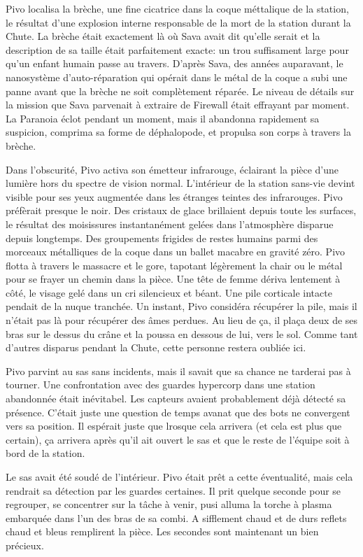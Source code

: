 Pivo localisa la brèche, une fine cicatrice dans la coque méttalique de la station, le résultat d'une explosion interne responsable de la mort de la station durant la Chute. La brèche était exactement là où Sava avait dit qu'elle serait et la description de sa taille était parfaitement exacte: un trou suffisament large pour qu'un enfant humain passe au travers. D'après Sava, des années auparavant, le nanosystème d'auto-réparation qui opérait dans le métal de la coque a subi une panne avant que la brèche ne soit complètement réparée. Le niveau de détails sur la mission que Sava parvenait à extraire de Firewall était effrayant par moment. La Paranoia éclot pendant un moment, mais il abandonna rapidement sa suspicion, comprima sa forme de déphalopode, et propulsa son corps à travers la brèche. 

Dans l'obscurité, Pivo activa son émetteur infrarouge, éclairant la pièce d'une lumière hors du spectre de vision normal. L'intérieur de la station sans-vie devint visible pour ses yeux augmentée dans les étranges teintes des infrarouges. Pivo préfèrait presque le noir. Des cristaux de glace brillaient depuis toute les surfaces, le résultat des moisissures instantanément gelées dans l'atmosphère disparue depuis longtemps. Des groupements frigides de restes humains parmi des morceaux métalliques de la coque dans un ballet macabre en gravité zéro. Pivo flotta à travers le massacre et le gore, tapotant légèrement la chair ou le métal pour se frayer un chemin dans la pièce. Une tête de femme dériva lentement à côté, le visage gelé dans un cri silencieux et béant. Une pile corticale intacte pendait de la nuque tranchée. Un instant, Pivo considéra récupérer la pile, mais il n'était pas là pour récupérer des âmes perdues. Au lieu de ça, il plaça deux de ses bras sur le dessus du crâne et la poussa en dessous de lui, vers le sol. Comme tant d'autres disparus pendant la Chute, cette personne restera oubliée ici. 

Pivo parvint au sas sans incidents, mais il savait que sa chance ne tarderai pas à tourner. Une confrontation avec des guardes hypercorp dans une station abandonnée était inévitabel. Les capteurs avaient probablement déjà détecté sa présence. C'était juste une question de temps avanat que des bots ne convergent vers sa position. Il espérait juste que lrosque cela arrivera (et cela est plus que certain), ça arrivera après qu'il ait ouvert le sas et que le reste de l'équipe soit à bord de la station. 

Le sas avait été soudé de l'intérieur. Pivo était prêt a cette éventualité, mais cela rendrait sa détection par les guardes certaines. Il prit quelque seconde pour se regrouper, se concentrer sur la tâche à venir, pusi alluma la torche à plasma embarquée dans l'un des bras de sa combi. A sifflement chaud et de durs reflets chaud et bleus remplirent la pièce. Les secondes sont maintenant un bien précieux. 

